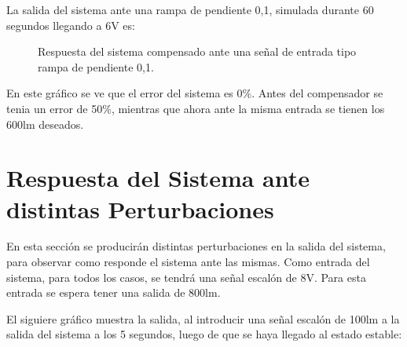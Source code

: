 \documentclass[a4paper,11pt]{article}
\begin{document}
La salida del sistema ante una rampa de pendiente 0,1, simulada durante 60 segundos llegando a 6V es:\\

	  \begin{figure}[H] %
	\caption{Respuesta del sistema compensado ante una señal de entrada tipo rampa de pendiente 0,1.}
	\label{fig:resp_rampa_comp1}
	\end{figure} 

En este gráfico se ve que el error del sistema es 0\%. Antes del compensador se tenia un error de 50\%, mientras que ahora ante la misma entrada se tienen los 600lm deseados.\\
\section{Respuesta del Sistema ante distintas Perturbaciones}

En esta sección se producirán distintas perturbaciones en la salida del sistema, para observar como responde el sistema ante las mismas. Como entrada del sistema, para todos los casos, se tendrá una señal escalón de 8V. Para esta entrada se espera tener una salida de 800lm.

El siguiere gráfico muestra la salida, al introducir una señal escalón de 100lm a la salida del sistema a los 5 segundos, luego de que se haya llegado al estado estable:\\
\end{document}
